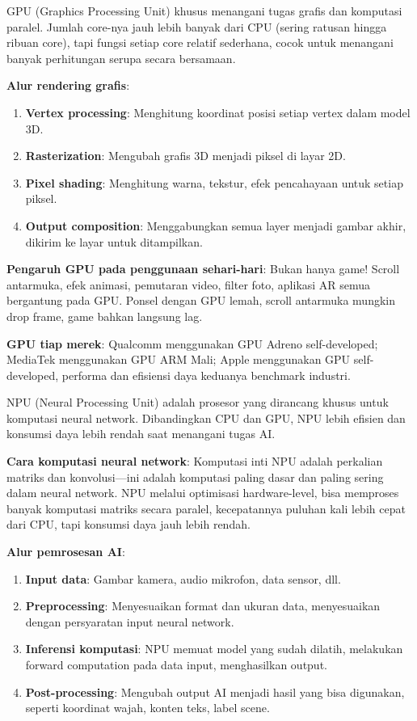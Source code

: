 GPU (Graphics Processing Unit) khusus menangani tugas grafis dan komputasi paralel. Jumlah core-nya jauh lebih banyak dari CPU (sering ratusan hingga ribuan core), tapi fungsi setiap core relatif sederhana, cocok untuk menangani banyak perhitungan serupa secara bersamaan.

\textbf{Alur rendering grafis}:

\begin{enumerate}
  \item \textbf{Vertex processing}: Menghitung koordinat posisi setiap vertex dalam model 3D.
  \item \textbf{Rasterization}: Mengubah grafis 3D menjadi piksel di layar 2D.
  \item \textbf{Pixel shading}: Menghitung warna, tekstur, efek pencahayaan untuk setiap piksel.
  \item \textbf{Output composition}: Menggabungkan semua layer menjadi gambar akhir, dikirim ke layar untuk ditampilkan.
\end{enumerate}

\textbf{Pengaruh GPU pada penggunaan sehari-hari}: Bukan hanya game! Scroll antarmuka, efek animasi, pemutaran video, filter foto, aplikasi AR semua bergantung pada GPU. Ponsel dengan GPU lemah, scroll antarmuka mungkin drop frame, game bahkan langsung lag.

\textbf{GPU tiap merek}: Qualcomm menggunakan GPU Adreno self-developed; MediaTek menggunakan GPU ARM Mali; Apple menggunakan GPU self-developed, performa dan efisiensi daya keduanya benchmark industri.


NPU (Neural Processing Unit) adalah prosesor yang dirancang khusus untuk komputasi neural network. Dibandingkan CPU dan GPU, NPU lebih efisien dan konsumsi daya lebih rendah saat menangani tugas AI.

\textbf{Cara komputasi neural network}: Komputasi inti NPU adalah perkalian matriks dan konvolusi—ini adalah komputasi paling dasar dan paling sering dalam neural network. NPU melalui optimisasi hardware-level, bisa memproses banyak komputasi matriks secara paralel, kecepatannya puluhan kali lebih cepat dari CPU, tapi konsumsi daya jauh lebih rendah.

\textbf{Alur pemrosesan AI}:

\begin{enumerate}
  \item \textbf{Input data}: Gambar kamera, audio mikrofon, data sensor, dll.
  \item \textbf{Preprocessing}: Menyesuaikan format dan ukuran data, menyesuaikan dengan persyaratan input neural network.
  \item \textbf{Inferensi komputasi}: NPU memuat model yang sudah dilatih, melakukan forward computation pada data input, menghasilkan output.
  \item \textbf{Post-processing}: Mengubah output AI menjadi hasil yang bisa digunakan, seperti koordinat wajah, konten teks, label scene.
\end{enumerate}

